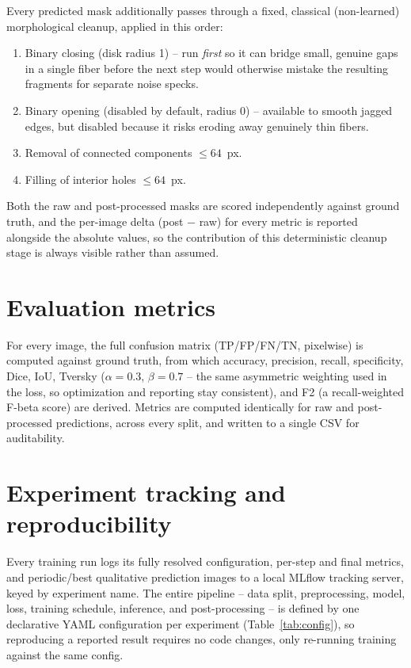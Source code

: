 \documentclass[11pt]{article}
\begin{document}
Every predicted mask additionally passes through a fixed, classical
(non-learned) morphological cleanup, applied in this order:

\begin{enumerate}[nosep]
  \item Binary closing (disk radius 1) -- run \emph{first} so it can bridge
        small, genuine gaps in a single fiber before the next step would
        otherwise mistake the resulting fragments for separate noise specks.
  \item Binary opening (disabled by default, radius 0) -- available to
        smooth jagged edges, but disabled because it risks eroding away
        genuinely thin fibers.
  \item Removal of connected components $\leq 64$~px.
  \item Filling of interior holes $\leq 64$~px.
\end{enumerate}

Both the raw and post-processed masks are scored independently against
ground truth, and the per-image delta (post $-$ raw) for every metric is
reported alongside the absolute values, so the contribution of this
deterministic cleanup stage is always visible rather than assumed.

\section{Evaluation metrics}

For every image, the full confusion matrix (TP/FP/FN/TN, pixelwise) is
computed against ground truth, from which accuracy, precision, recall,
specificity, Dice, IoU, Tversky ($\alpha=0.3$, $\beta=0.7$ -- the same
asymmetric weighting used in the loss, so optimization and reporting stay
consistent), and F2 (a recall-weighted F-beta score) are derived. Metrics are
computed identically for raw and post-processed predictions, across every
split, and written to a single CSV for auditability.

\section{Experiment tracking and reproducibility}

Every training run logs its fully resolved configuration, per-step and final
metrics, and periodic/best qualitative prediction images to a local MLflow
tracking server, keyed by experiment name. The entire pipeline -- data
split, preprocessing, model, loss, training schedule, inference, and
post-processing -- is defined by one declarative YAML configuration per
experiment (Table~\ref{tab:config}), so reproducing a reported result
requires no code changes, only re-running training against the same config.
\end{document}
